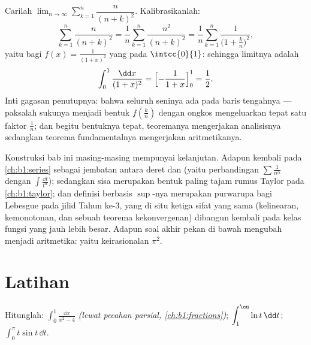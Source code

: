 \begin{example}\label{ex:b1:integration:riemann2}
Carilah $\lim_{n\to\infty} \sum_{k=1}^{n} \dfrac{n}{(n+k)^2}$.
Kalibrasikanlah:
\[
\sum_{k=1}^{n} \frac{n}{(n+k)^2}
= \frac{1}{n}\sum_{k=1}^{n} \frac{n^2}{(n+k)^2}
= \frac1n \sum_{k=1}^{n} \frac{1}{\bigl(1 + \frac kn\bigr)^2} ,
\]
yaitu  bagi $f(x) = \frac{1}{(1+x)^2}$ yang  pada
$\intcc{0}{1}$: sehingga limitnya adalah
\[
\int_0^1 \frac{\dd x}{(1 + x)^2}
= \Bigl[-\frac{1}{1+x}\Bigr]_0^1 = \frac12 .
\]
Inti gagasan penutupnya: bahwa seluruh seninya ada pada baris tengahnya ---
paksalah sukunya menjadi bentuk $f(\frac kn)$ dengan ongkos
mengeluarkan tepat satu faktor $\frac1n$; dan begitu bentuknya
tepat, teoremanya mengerjakan analisisnya sedangkan teorema fundamentalnya
mengerjakan aritmetikanya.
\end{example}

\begin{remark}
Konstruksi bab ini masing-masing mempunyai kelanjutan. Adapun 
kembali pada \cref{ch:b1:series} sebagai jembatan antara deret dan
 (yaitu perbandingan $\sum \frac{1}{n^\alpha}$ dengan $\int
\frac{\dd t}{t^\alpha}$); sedangkan sisa  merupakan bentuk paling
tajam rumus Taylor pada \cref{ch:b1:taylor}; dan
definisi berbasis $\sup$-nya merupakan purwarupa bagi 
Lebesgue pada jilid Tahun ke-3, yang di situ ketiga sifat yang sama
(kelinearan, kemonotonan, dan sebuah teorema kekonvergenan) dibangun kembali pada
kelas fungsi yang jauh lebih besar. Adapun soal akhir pekan di bawah
mengubah  menjadi aritmetika: yaitu keirasionalan
$\pi^2$.
\end{remark}

\section{Latihan}

\begin{exercise}[$\star$]\label{exo:b1:integration:1}
Hitunglah: $\displaystyle\int_0^1 \frac{\dd x}{x^2 - 4}$
\emph{(lewat pecahan parsial, \cref{ch:b1:fractions})};
$\displaystyle\int_1^{\eu} \ln t \,\dd t$;
$\displaystyle\int_0^{\pi} t \sin t\, \dd t$.
\end{exercise}

